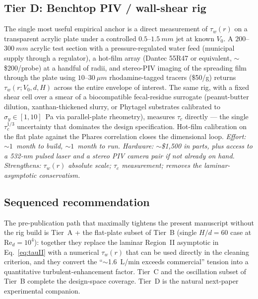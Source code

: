 \documentclass[aps,prfluids,reprint,amsmath,amssymb,floatfix]{revtex4-2}
\newcommand{\Rey}{\mathrm{Re}}
\begin{document}
\subsection*{Tier D: Benchtop PIV / wall-shear rig}
The single most useful empirical anchor is a direct measurement of
$\tau_w(r)$ on a transparent acrylic plate under a controlled
$0.5$--$\SI{1.5}{mm}$ jet at known $V_0$. A $200$--$\SI{300}{mm}$
acrylic test section with a pressure-regulated water feed
(municipal supply through a regulator), a hot-film array
(Dantec 55R47 or equivalent, $\sim$\$200/probe) at a handful of
radii, and stereo-PIV imaging of the spreading film through the
plate using $10$--$\SI{30}{\mu m}$ rhodamine-tagged tracers
(\$50/g) returns $\tau_w(r;V_0,d,H)$ across the entire envelope of
interest. The same rig, with a fixed shear cell over a smear of a
biocompatible fecal-residue surrogate (peanut-butter dilution,
xanthan-thickened slurry, or Phytagel substrates calibrated to
$\sigma_y \in [1, 10]$~Pa via parallel-plate rheometry), measures
$\tau_c$ directly --- the single $\tau_c^{1/3}$ uncertainty that
dominates the design specification. Hot-film calibration on the
flat plate against the Phares correlation closes the dimensional
loop.
\textit{Effort: $\sim 1$~month to build, $\sim 1$~month to run.
Hardware: $\sim$\$1{,}500 in parts, plus access to a 532-nm pulsed
laser and a stereo PIV camera pair if not already on hand.
Strengthens: $\tau_w(r)$ absolute scale; $\tau_c$ measurement;
removes the laminar-asymptotic conservatism.}

\subsection*{Sequenced recommendation}
The pre-publication path that maximally tightens the present
manuscript without the rig build is Tier~A + the flat-plate
subset of Tier~B (single $H/d = 60$ case at $\Rey_d = 10^4$):
together they replace the laminar Region~II asymptotic in
Eq.~\eqref{eq:tauII} with a numerical $\tau_w(r)$ that can be used
directly in the cleaning criterion, and they convert the
``$\sim$\SI{1.6}{L/min} exceeds commercial'' tension into a
quantitative turbulent-enhancement factor. Tier~C and the
oscillation subset of Tier~B complete the design-space coverage.
Tier~D is the natural next-paper experimental companion.


\end{document}
